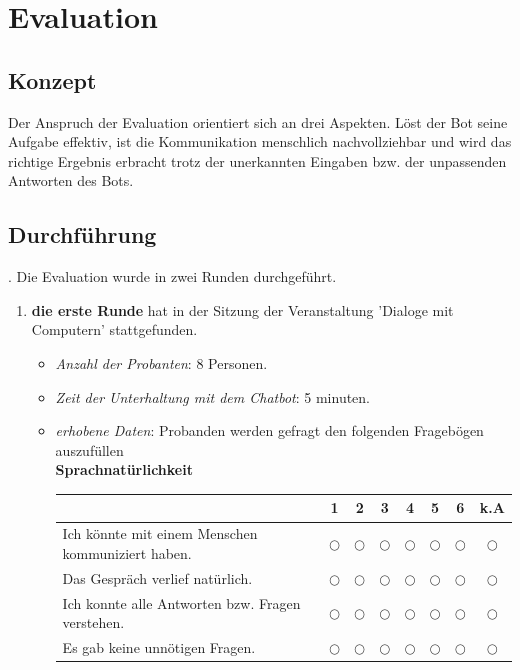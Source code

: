 \documentclass[12pt,a4paper]{scrartcl}
\begin{document}
\section{Evaluation}
\subsection{Konzept}
Der Anspruch der Evaluation orientiert sich an drei Aspekten. Löst der Bot seine Aufgabe effektiv, ist die Kommunikation menschlich nachvollziehbar und wird das richtige Ergebnis erbracht trotz der unerkannten Eingaben bzw. der unpassenden Antworten des Bots.
\subsection{Durchführung}.
Die Evaluation wurde in zwei Runden durchgeführt.
\begin{enumerate}
\item \textbf{die erste Runde} hat in der Sitzung der Veranstaltung 'Dialoge mit Computern' stattgefunden.
\begin{itemize}

\item \textit{Anzahl der Probanten}: 8 Personen.
\item \textit{Zeit der Unterhaltung mit dem Chatbot}: 5 minuten.
\item \textit{erhobene Daten}: Probanden werden gefragt den folgenden Fragebögen auszufüllen\\

\textbf{Sprachnatürlichkeit}
\begin{center}
\begin{tabularx}{\linewidth}{|X|cccccc|c|}

\hline

&1&2&3&4 &5 &6 &k.A \\ \hline
Ich könnte mit einem Menschen kommuniziert haben. & $\bigcirc$ & $\bigcirc$ & $\bigcirc$ & $\bigcirc$  & $\bigcirc$  & $\bigcirc$  &$\bigcirc$ \\ \hline

Das Gespräch verlief natürlich. & $\bigcirc$ & $\bigcirc$ & $\bigcirc$ & $\bigcirc$  & $\bigcirc$  & $\bigcirc$  &$\bigcirc$ \\ \hline

Ich konnte alle Antworten bzw. Fragen verstehen. & $\bigcirc$ & $\bigcirc$ & $\bigcirc$ & $\bigcirc$  & $\bigcirc$  & $\bigcirc$  &$\bigcirc$\\ \hline

Es gab keine unnötigen Fragen.  & $\bigcirc$ & $\bigcirc$ & $\bigcirc$ & $\bigcirc$  & $\bigcirc$  & $\bigcirc$  &$\bigcirc$ \\ \hline



\end{tabularx}
\end{center}
\end{itemize}
\end{enumerate}
\end{document}
